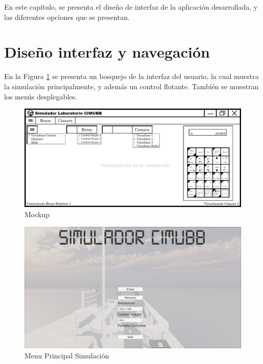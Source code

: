 En este capítulo, se presenta el diseño de interfaz de la aplicación desarrollada, y las diferentes opciones que se presentan.
\section{Diseño interfaz y navegación}

En la Figura \ref{fig:Mockup} se presenta un bosquejo de la interfaz del usuario, la cual muestra la simulación principalmente, y además un control flotante. También se muestran los menús desplegables.
\begin{figure}[ht]
\centering
\includegraphics[width=16cm]{figures/Mockup.png}
\caption{Mockup}
\label{fig:Mockup}
\end{figure}
\clearpage

\begin{figure}[ht]
\centering
\includegraphics[width=16cm]{figures/menu.png}
\caption{Menu Principal Simulación}
\label{fig:menu}
\end{figure}

